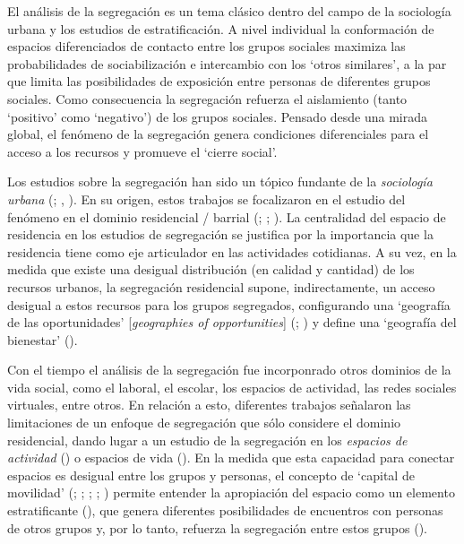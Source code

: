 \documentclass[
  spanish,
  a4paper,%
  chapterprefix=true,%
  DIV=calc,%
  twoside]{scrbook}%
\begin{document}
El análisis de la segregación es un tema clásico dentro del campo de la
sociología urbana y los estudios de estratificación.
A nivel individual la conformación de espacios diferenciados de contacto
entre los grupos sociales maximiza las probabilidades de sociabilización
e intercambio con los `otros similares', a la par que limita las
posibilidades de exposición entre personas de diferentes grupos
sociales. Como consecuencia la segregación refuerza el aislamiento
(tanto `positivo' como `negativo') de los grupos sociales. Pensado desde
una mirada global, el fenómeno de la segregación genera condiciones
diferenciales para el acceso a los recursos y promueve el `cierre
social'.

Los estudios sobre la segregación han sido un tópico fundante de la
\emph{sociología urbana} (; , ). En su
origen, estos trabajos se focalizaron en el estudio del fenómeno en el
dominio residencial / barrial (; ; ).
La centralidad del espacio de residencia en los estudios de segregación
se justifica por la importancia que la residencia tiene como eje
articulador en las actividades cotidianas. A su vez, en la medida que
existe una desigual distribución (en calidad y cantidad) de los recursos
urbanos, la segregación residencial supone, indirectamente, un acceso
desigual a estos recursos para los grupos segregados, configurando una
`geografía de las oportunidades' {[}\emph{geographies of opportunities}{]}
(; ) y define una `geografía del bienestar'
().

Con el tiempo el análisis de la segregación fue incorponrado otros
dominios de la vida social, como el laboral, el escolar, los espacios de
actividad, las redes sociales virtuales, entre otros. En relación a
esto, diferentes trabajos señalaron las limitaciones de un enfoque de
segregación que sólo considere el dominio residencial, dando lugar a un
estudio de la segregación en los \emph{espacios de actividad} () o
espacios de vida (). En la medida que esta capacidad para
conectar espacios es desigual entre los grupos y personas, el concepto
de `capital de movilidad' (; ; ; ; ) permite entender la apropiación del espacio
como un elemento estratificante (), que genera diferentes
posibilidades de encuentros con personas de otros grupos y, por lo
tanto, refuerza la segregación entre estos grupos ().
\end{document}
